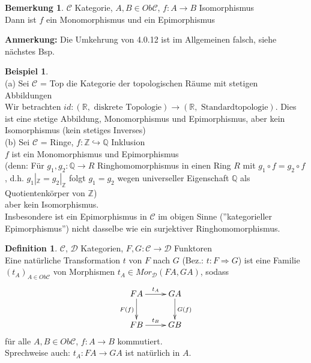 \documentclass[10pt,a4paper,numbers=endperiod]{scrreprt}
\theoremstyle{definition}
\newtheorem{defi}[satz]{Definition}
\newtheorem{bem}[satz]{Bemerkung}
\newtheorem{bsp}[satz]{Beispiel}
\def\QQ{{\mathbb Q}}
\def\RR{{\mathbb R}}
\def\ZZ{{\mathbb Z}}
\begin{document}
\begin{bem}
	$\mathcal{C}$ Kategorie, $A, B \in Ob \mathcal{C}$, $f: A \rightarrow B$ Isomorphismus\\
	Dann ist $f$ ein Monomorphismus und ein Epimorphismus
\end{bem}

\textbf{Anmerkung:} Die Umkehrung von 4.0.12 ist im Allgemeinen falsch, siehe nächstes Bsp.

\begin{bsp}
	$ $\\
	(a) Sei $\mathcal{C}$ = Top die Kategorie der topologischen Räume mit stetigen Abbildungen\\
	Wir betrachten $id: (\RR, \text{ diskrete Topologie}) \rightarrow (\RR, \text{ Standardtopologie})$. Dies ist eine stetige Abbildung, Monomorphismus und Epimorphismus, aber kein Isomorphismus (kein stetiges Inverses)\\
	(b) Sei $\mathcal{C}$ = Ringe, $f: \ZZ \hookrightarrow \QQ$ Inklusion\\
	$f$ ist ein Monomorphismus und Epimorphismus\\
	(denn: Für $g_1, g_2: \QQ \rightarrow R$ Ringhomomorphismus in einen Ring $R$ mit $g_1 \circ f = g_2 \circ f$, d.h. $g_1|_\ZZ = g_2|_\ZZ$ folgt $g_1 = g_2$ wegen universeller Eigenschaft $\QQ$ als Quotientenkörper von $\ZZ$)\\
	aber kein Isomorphismus.\\
	Insbesondere ist ein Epimorphismus in $\mathcal{C}$ im obigen Sinne (''kategorieller Epimorphismus'') nicht dasselbe wie ein surjektiver Ringhomomorphismus. 
\end{bsp}

\begin{defi}
	$\mathcal{C}$, $\mathcal{D}$ Kategorien, $F, G: \mathcal{C} \rightarrow \mathcal{D}$ Funktoren\\
	Eine natürliche Transformation $t$ von $F$ nach $G$ (Bez.: $t: F \Rightarrow G$) ist eine Familie $(t_A)_{A \in Ob \mathcal{C}}$ von Morphismen $t_A \in Mor_{\mathcal{D}}(FA, GA)$, sodass \begin{align*}
		\begin{xy}
		\xymatrix{
			FA \ar[r]^{t_A} \ar[d]_{F(f)}    &   GA \ar[d]^{G(f)}  \\
			FB \ar[r]^{t_B} &   GB
		}
		\end{xy}
	\end{align*}
	für alle $A, B \in Ob \mathcal{C}$, $f: A \rightarrow B$ kommutiert.\\
	Sprechweise auch: $t_A: FA \rightarrow GA$ ist natürlich in $A$. 
\end{defi}
\end{document}

